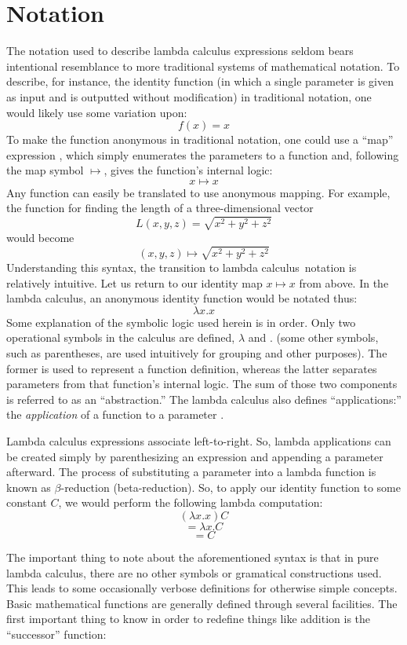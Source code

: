 \documentclass[twocolumn,titlepage,12pt]{article}
\begin{document}
\section{Notation}
The notation used to describe lambda calculus expressions seldom bears intentional resemblance to more traditional systems of mathematical notation. To describe, for instance, the identity function (in which a single parameter is given as input and is outputted without modification) in traditional notation, one would likely use some variation upon:
$$f(x)=x$$
To make the function anonymous in traditional notation, one could use a ``map'' expression \cite{intrographtheory}, which simply enumerates the parameters to a function and, following the map symbol $\mapsto$, gives the function's internal logic:
$$x\mapsto x$$
Any function can easily be translated to use anonymous mapping. For example, the function for finding the length of a three-dimensional vector
$$L(x,y,z)=\sqrt{x^2+y^2+z^2}$$
would become
$$(x,y,z) \mapsto \sqrt{x^2+y^2+z^2}$$
Understanding this syntax, the transition to lambda calculus notation is relatively intuitive. Let us return to our identity map $x\mapsto x$ from above. In the lambda calculus, an anonymous identity function would be notated thus:
$$\lambda x.x$$
Some explanation of the symbolic logic used herein is in order. Only two operational symbols in the calculus are defined, $\lambda$ and $.$ (some other symbols, such as parentheses, are used intuitively for grouping and other purposes). The former is used to represent a function definition, whereas the latter separates parameters from that function's internal logic. The sum of those two components is referred to as an ``abstraction.'' The lambda calculus also defines ``applications:'' the \textit{application} of a function to a parameter \cite{horowitz}.

Lambda calculus expressions associate left-to-right. So, lambda applications can be created simply by parenthesizing an expression and appending a parameter afterward. The process of substituting a parameter into a lambda function is known as $\beta$-reduction (beta-reduction). So, to apply our identity function to some constant $C$, we would perform the following lambda computation:
$$(\lambda x.x)C$$
$$=\lambda x.C$$
$$=C$$

The important thing to note about the aforementioned syntax is that in pure lambda calculus, there are no other symbols or gramatical constructions used. This leads to some occasionally verbose definitions for otherwise simple concepts. Basic mathematical functions are generally defined through several facilities. The first important thing to know in order to redefine things like addition is the ``successor'' function:
$$$$
\end{document}
